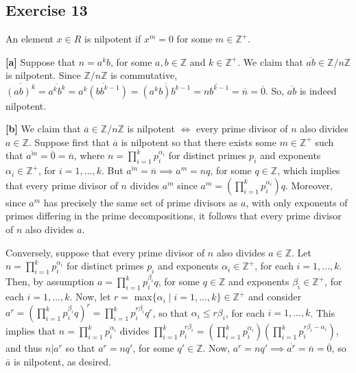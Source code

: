 \subsection*{Exercise 13}
An element $x \in R$ is nilpotent if $x^m = 0$ for some $m \in \mathbb{Z}^+$.

\vspace{3 mm} 

\textbf{[a]} Suppose that $n = a^kb$, for some $a,b \in \mathbb{Z}$ and $k \in \mathbb{Z}^+$. We claim that $\overline{ab} \in \mathbb{Z}/n\mathbb{Z}$ is nilpotent. Since $\mathbb{Z}/n\mathbb{Z}$ is commutative, $\overline{(ab)^{k}} = \overline{a^kb^k} = \overline{a^k(bb^{k-1})} = \overline{(a^kb)b^{k-1}} = \overline{nb^{k-1}} = \overline{n} = \overline{0}$. So, $\overline{ab}$ is indeed nilpotent.

\vspace{3 mm} 

\textbf{[b]}
We claim that $\overline{a} \in \mathbb{Z}/n\mathbb{Z}$ is nilpotent $\iff$ every prime divisor of $n$ also divides $a \in \mathbb{Z}$. Suppose first that $\overline{a}$ is nilpotent so that there exists some $m \in \mathbb{Z}^+$ such that $\overline{a^m} = \overline{0} = \overline{n}$, where $n = \prod_{i=1}^kp_i^{\alpha_i}$ for distinct primes $p_i$ and exponents $\alpha_i \in \mathbb{Z}^+$, for $i = 1,...,k$. But $\overline{a^m} = \overline{n} \implies a^m = nq$, for some $q \in \mathbb{Z}$, which implies that every prime divisor of $n$ divides $a^m$ since $a^m = (\prod_{i=1}^kp_i^{\alpha_i})q$. Moreover, since $a^m$ has precisely the same set of prime divisors as $a$, with only exponents of primes differing in the prime decompositions, it follows that every prime divisor of $n$ also divides $a$.

Conversely, suppose that every prime divisor of $n$ also divides $a \in \mathbb{Z}$. Let $n = \prod_{i=1}^kp_i^{\alpha_i}$ for distinct primes $p_i$ and exponents $\alpha_i \in \mathbb{Z}^+$, for each $i = 1,...,k$. Then, by assumption $a = \prod_{i=1}^kp_i^{\beta_i}q$, for some $q \in \mathbb{Z}$ and exponents $\beta_i \in \mathbb{Z}^+$, for each $i = 1,...,k$. Now, let $r =$ max$\{\alpha_i \mid i = 1,...,k\} \in \mathbb{Z}^+$ and consider $a^r = (\prod_{i=1}^kp_i^{\beta_i}q)^r = \prod_{i=1}^kp_i^{r\beta_i}q^r$, so that $\alpha_i \le r\beta_i$, for each $i = 1,...,k$. This implies that $n = \prod_{i=1}^kp_i^{\alpha_i}$ divides $\prod_{i=1}^kp_i^{r\beta_i} = (\prod_{i=1}^kp_i^{\alpha_i})(\prod_{i=1}^kp_i^{r\beta_i - \alpha_i})$, and thus $n | a^r$ so that $a^r = nq'$, for some $q' \in \mathbb{Z}$. Now, $a^r = nq' \implies \overline{a^r} = \overline{n} = \overline{0}$, so $\overline{a}$ is nilpotent, as desired.

